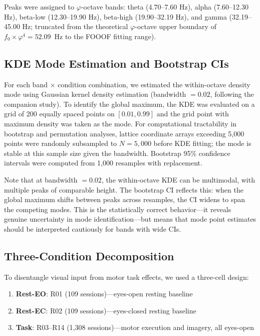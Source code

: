 \documentclass[11pt,a4paper]{article}
\newcommand{\phisym}{\varphi}
\newcommand{\fzero}{f_0}
\begin{document}
Peaks were assigned to $\phisym$-octave bands: theta (4.70--7.60 Hz), alpha (7.60--12.30 Hz), beta-low (12.30--19.90 Hz), beta-high (19.90--32.19 Hz), and gamma (32.19--45.00 Hz; truncated from the theoretical $\phisym$-octave upper boundary of $\fzero \times \phisym^4 = 52.09$~Hz to the FOOOF fitting range).

\subsection{KDE Mode Estimation and Bootstrap CIs}
\label{sec:kde}

For each band $\times$ condition combination, we estimated the within-octave density mode using Gaussian kernel density estimation (bandwidth $= 0.02$, following the companion study). To identify the global maximum, the KDE was evaluated on a grid of 200 equally spaced points on $[0.01, 0.99]$ and the grid point with maximum density was taken as the mode. For computational tractability in bootstrap and permutation analyses, lattice coordinate arrays exceeding 5,000 points were randomly subsampled to $N = 5{,}000$ before KDE fitting; the mode is stable at this sample size given the bandwidth. Bootstrap 95\% confidence intervals were computed from 1,000 resamples with replacement.

Note that at bandwidth $= 0.02$, the within-octave KDE can be multimodal, with multiple peaks of comparable height. The bootstrap CI reflects this: when the global maximum shifts between peaks across resamples, the CI widens to span the competing modes. This is the statistically correct behavior---it reveals genuine uncertainty in mode identification---but means that mode point estimates should be interpreted cautiously for bands with wide CIs.

\subsection{Three-Condition Decomposition}
\label{sec:conditions}

To disentangle visual input from motor task effects, we used a three-cell design:
\begin{enumerate}
    \item \textbf{Rest-EO}: R01 (109 sessions)---eyes-open resting baseline
    \item \textbf{Rest-EC}: R02 (109 sessions)---eyes-closed resting baseline
    \item \textbf{Task}: R03--R14 (1,308 sessions)---motor execution and imagery, all eyes-open
\end{enumerate}
\end{document}

